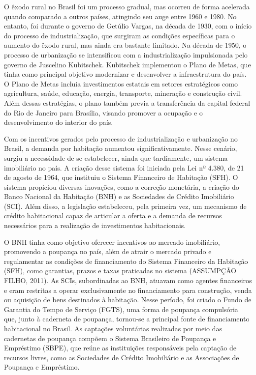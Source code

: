 \documentclass[
  12pt,
  a4paper,
]{scrreprt}
\begin{document}
\vspace{12pt}

O êxodo rural no Brasil foi um processo gradual, mas ocorreu de forma
acelerada quando comparado a outros países, atingindo seu auge entre
1960 e 1980. No entanto, foi durante o governo de Getúlio Vargas, na
década de 1930, com o início do processo de industrialização, que
surgiram as condições específicas para o aumento do êxodo rural, mas
ainda era bastante limitado. Na década de 1950, o processo de
urbanização se intensificou com a industrialização impulsionada pelo
governo de Juscelino Kubitschek. Kubitschek implementou o Plano de
Metas, que tinha como principal objetivo modernizar e desenvolver a
infraestrutura do país. O Plano de Metas incluia investimentos estatais
em setores estratégicos como agricultura, saúde, educação, energia,
transporte, mineração e construção civil. Além dessas estratégias, o
plano também previa a transferência da capital federal do Rio de Janeiro
para Brasília, visando promover a ocupação e o desenvolvimento do
interior do país.

\vspace{12pt}

Com os incentivos gerados pelo processo de industrialização e
urbanização no Brasil, a demanda por habitação aumentou
significativamente. Nesse cenário, surgiu a necessidade de se
estabelecer, ainda que tardiamente, um sistema imobiliário no país. A
criação desse sistema foi iniciada pela Lei nº 4.380, de 21 de agosto de
1964, que instituiu o Sistema Financeiro de Habitação (SFH). O sistema
propiciou diversas inovações, como a correção monetária, a criação do
Banco Nacional da Habitação (BNH) e as Sociedades de Crédito Imobiliário
(SCI). Além disso, a legislação estabeleceu, pela primeira vez, um
mecanismo de crédito habitacional capaz de articular a oferta e a
demanda de recursos necessários para a realização de investimentos
habitacionais.

\vspace{12pt}

O BNH tinha como objetivo oferecer incentivos ao mercado imobiliário,
promovendo a poupança no país, além de atrair o mercado privado e
regulamentar as condições de financiamento do Sistema Financeiro da
Habitação (SFH), como garantias, prazos e taxas praticadas no sistema
(ASSUMPÇÃO FILHO, 2011). As SCIs, subordinadas ao BNH, atuavam como
agentes financeiros e eram restritas a operar exclusivamente no
financiamento para construção, venda ou aquisição de bens destinados à
habitação. Nesse período, foi criado o Fundo de Garantia do Tempo de
Serviço (FGTS), uma forma de poupança compulsória que, junto à caderneta
de poupança, tornou-se a principal fonte de financiamento habitacional
no Brasil. As captações voluntárias realizadas por meio das cadernetas
de poupança compõem o Sistema Brasileiro de Poupança e Empréstimo
(SBPE), que reúne as instituições responsáveis pela captação de recursos
livres, como as Sociedades de Crédito Imobiliário e as Associações de
Poupança e Empréstimo.
\end{document}
